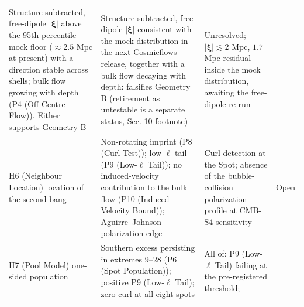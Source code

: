 \documentclass[
]{article}
\begin{document}
\begin{longtable}[]{@{}llll@{}}
\begin{minipage}[t]{0.22\columnwidth}
Structure-subtracted, free-dipole \(|\boldsymbol{\xi}|\) above the
95th-percentile mock floor (\(\approx 2.5\) Mpc at present) with a
direction stable across shells; bulk flow growing with depth (P4
(Off-Centre Flow)). Either supports Geometry B\strut
\end{minipage} & \begin{minipage}[t]{0.22\columnwidth}\raggedright
Structure-subtracted, free-dipole \(|\boldsymbol{\xi}|\) consistent with
the mock distribution in the next Cosmicflows release, together with a
bulk flow decaying with depth: falsifies Geometry B (retirement as
untestable is a separate status, Sec. 10 footnote)\strut
\end{minipage} & \begin{minipage}[t]{0.22\columnwidth}\raggedright
Unresolved; \(|\boldsymbol{\xi}| \lesssim 2\) Mpc, \(1.7\) Mpc residual
inside the mock distribution, awaiting the free-dipole re-run\strut
\end{minipage}\tabularnewline
\begin{minipage}[t]{0.22\columnwidth}\raggedright
H6 (Neighbour Location) location of the second bang\strut
\end{minipage} & \begin{minipage}[t]{0.22\columnwidth}\raggedright
Non-rotating imprint (P8 (Curl Test)); low-\(\ell\) tail (P9
(Low-\(\ell\) Tail)); no induced-velocity contribution to the bulk flow
(P10 (Induced-Velocity Bound)); Aguirre--Johnson polarization edge\strut
\end{minipage} & \begin{minipage}[t]{0.22\columnwidth}\raggedright
Curl detection at the Spot; absence of the bubble-collision polarization
profile at CMB-S4 sensitivity\strut
\end{minipage} & \begin{minipage}[t]{0.22\columnwidth}\raggedright
Open\strut
\end{minipage}\tabularnewline
\begin{minipage}[t]{0.22\columnwidth}\raggedright
H7 (Pool Model) one-sided population\strut
\end{minipage} & \begin{minipage}[t]{0.22\columnwidth}\raggedright
Southern excess persisting in extremes \(9\)--\(28\) (P6 (Spot
Population)); positive P9 (Low-\(\ell\) Tail); zero curl at all eight
spots\strut
\end{minipage} & \begin{minipage}[t]{0.22\columnwidth}\raggedright
All of: P9 (Low-\(\ell\) Tail) failing at the pre-registered threshold;

\end{minipage}
\end{longtable}
\end{document}
